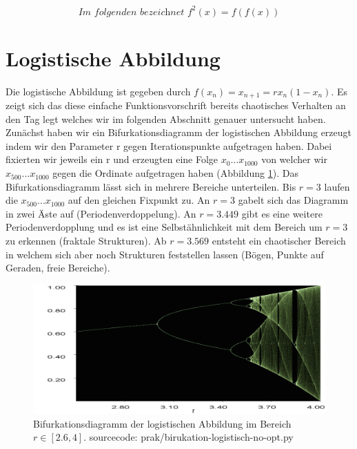 \documentclass[12pt,a4paper]{article}
\begin{document}
\pagebreak
\tableofcontents
\pagebreak
$$\textit{Im folgenden bezeichnet }f^2(x) = f(f(x))$$

\section{Logistische Abbildung}
Die logistische Abbildung ist gegeben durch $f(x_n)=x_{n+1}=rx_n(1-x_n)$. Es zeigt sich das diese einfache Funktionsvorschrift 
bereits chaotisches Verhalten an den Tag legt welches wir im folgenden Abschnitt genauer untersucht haben. Zunächst haben 
wir ein Bifurkationsdiagramm der logistischen Abbildung erzeugt indem wir den Parameter r gegen Iterationspunkte aufgetragen haben. Dabei fixierten wir jeweils ein r und erzeugten eine Folge $x_0 ... x_{1000}$ von welcher wir $x_{500} ... x_{1000}$ gegen die Ordinate aufgetragen haben (Abbildung \ref{fig:bifurkation-sin-nice}).
Das Bifurkationsdiagramm lässt sich in mehrere Bereiche unterteilen. Bis $r=3$ laufen die $x_{500}...x_{1000}$ auf den gleichen Fixpunkt zu. An $r=3$ gabelt sich das Diagramm in zwei Äste auf (Periodenverdoppelung). An $r=3.449$ gibt es eine weitere Periodenverdopplung und es ist eine Selbstähnlichkeit mit dem Bereich um $r=3$ zu erkennen (fraktale Strukturen). Ab $r=3.569$ entsteht ein chaotischer Bereich in welchem sich aber noch Strukturen feststellen lassen (Bögen, Punkte auf Geraden, freie Bereiche).
\begin{figure}[!htbp]
	\centering
	\includegraphics[scale=0.30]{bifurkation}
	\caption{Bifurkationsdiagramm der logistischen Abbildung im Bereich $r\in[2.6,4]$. sourcecode: prak/birukation-logistisch-no-opt.py}
	\label{fig:bifurkation-sin-nice}
\end{figure}
\end{document}
